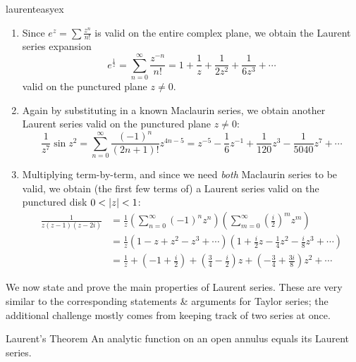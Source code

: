 \begin{examples}{}{laurenteasyex}
\begin{enumerate}
	
	  \item Since $e^z=\sum \frac{z^n}{n!}$ is valid on the entire complex plane, we obtain the Laurent series expansion
	  \[
	  	e^{\frac 1z}=\sum_{n=0}^\infty\frac{z^{-n}}{n!}=1+\frac 1z+\frac 1{2z^2}+\frac 1{6z^3}+\cdots
	  \]
	  valid on the punctured plane $z\neq 0$.
	  
	  \item Again by substituting in a known Maclaurin series, we obtain another Laurent series valid on the punctured plane $z\neq 0$:
	  \[
	  	\frac 1{z^7}\sin z^2
	  	=\sum_{n=0}^\infty\frac{(-1)^n}{(2n+1)!}z^{4n-5} 
	  	=z^{-5}-\frac 16z^{-1}+\frac 1{120}z^3-\frac 1{5040}z^7+\cdots
	  \]
	  
	  \item Multiplying term-by-term, and since we need \emph{both} Maclaurin series to be valid, we obtain (the first few terms of) a Laurent series valid on the punctured disk $0<\left| z\right|<1$:
	  \begin{align*}
		  \frac 1{z(z-1)(z-2i)}&=\frac 1z\left(\sum_{n=0}^\infty (-1)^nz^n\right)\left(\sum_{m=0}^\infty\left(\frac i2\right)^mz^m\right)\\
		  &=\frac 1z\left(1-z+z^2-z^3+\cdots\right)\left(1+\frac i2z-\frac 14z^2-\frac i8z^3+\cdots\right)\\
		  &=\frac 1z+\left(-1+\frac i2\right)+\left(\frac 34-\frac i2\right)z+\left(-\frac 34+\frac{3i}8\right)z^2+\cdots
	  \end{align*}
	\end{enumerate}
\end{examples}

\goodbreak



We now state and prove the main properties of Laurent series. These are very similar to the corresponding statements \& arguments for Taylor series; the additional challenge mostly comes from keeping track of two series at once.

\begin{thm}{Laurent's Theorem}{}
	An analytic function on an open annulus equals its Laurent series.
\end{thm}

